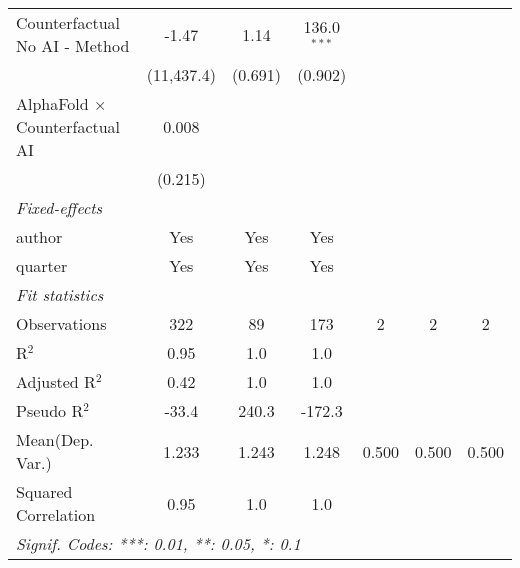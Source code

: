 \begin{tabular}{lcccccc}
   Counterfactual No AI - Method         & -1.47          & 1.14           & 136.0$^{***}$ &     &     &   \\   
                                         & (11,437.4)     & (0.691)        & (0.902)       &     &     &   \\   
   AlphaFold $\times$ Counterfactual AI  & 0.008          &                &               &     &     &   \\   
                                         & (0.215)        &                &               &     &     &   \\   
   \midrule
   \emph{Fixed-effects}\\
   author                                & Yes            & Yes            & Yes           &     &     & \\  
   quarter                               & Yes            & Yes            & Yes           &     &     & \\  
   \midrule
   \emph{Fit statistics}\\
   Observations                          & 322            & 89             & 173           & 2   & 2   & 2\\  
   R$^2$                                 & 0.95           & 1.0            & 1.0           &     &     & \\  
   Adjusted R$^2$                        & 0.42           & 1.0            & 1.0           &     &     & \\  
   Pseudo R$^2$                          & -33.4          & 240.3          & -172.3        &     &     & \\  
Mean(Dep. Var.) & 1.233 & 1.243 & 1.248 & 0.500 & 0.500 & 0.500 \\
   Squared Correlation                   & 0.95           & 1.0            & 1.0           &     &     & \\  
   \midrule \midrule
   \multicolumn{7}{l}{\emph{Signif. Codes: ***: 0.01, **: 0.05, *: 0.1}}\\
\end{tabular}
\par\endgroup
